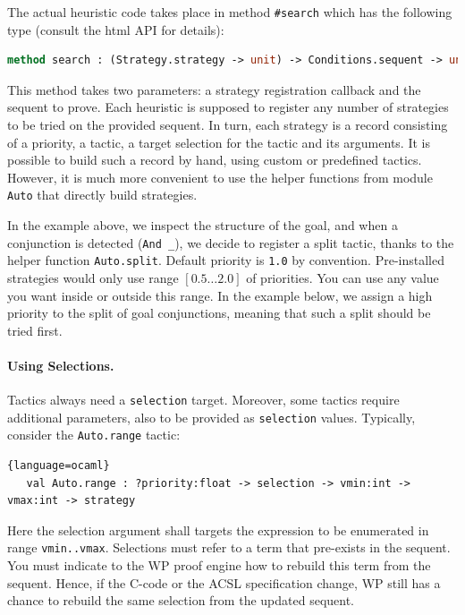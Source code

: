 The actual heuristic code takes place in method \lstinline$#search$ which has the following type (consult the html API for details):
\begin{lstlisting}[language=ocaml]
    method search : (Strategy.strategy -> unit) -> Conditions.sequent -> unit
\end{lstlisting}

This method takes two parameters: a strategy registration callback and the sequent to prove. Each heuristic
is supposed to register any number of strategies to be tried on the provided sequent. In turn, each strategy
is a record consisting of a priority, a tactic, a target selection for the tactic and its arguments.
It is possible to build such a record by hand, using custom or predefined tactics. However, it is much more convenient
to use the helper functions from module \lstinline$Auto$ that directly build strategies.

In the example above, we inspect the structure of the goal, and when a conjunction is detected (\lstinline$And _$),
we decide to register a split tactic, thanks to the helper function \lstinline$Auto.split$. Default priority is \lstinline$1.0$ by convention. Pre-installed strategies would only use range $[0.5\ldots2.0]$ of priorities. You can use any value you want inside or outside this range. In the example below, we assign a high priority to the split of goal conjunctions, meaning that such a split should be tried first.

\paragraph{Using Selections.} Tactics always need a \lstinline$selection$ target. Moreover, some tactics require additional parameters, also to be provided as \lstinline$selection$ values. Typically, consider the \lstinline$Auto.range$ tactic:

\begin{lstlisting}{language=ocaml}
   val Auto.range : ?priority:float -> selection -> vmin:int -> vmax:int -> strategy
\end{lstlisting}

Here the selection argument shall targets the expression to be enumerated in range \lstinline$vmin..vmax$.
Selections must refer to a term that pre-exists in the sequent. You must indicate to the \textsf{WP} proof engine
how to rebuild this term from the sequent. Hence, if the \textsf{C}-code or the \textsf{ACSL} specification change,
\textsf{WP} still has a chance to rebuild the same selection from the updated sequent.

